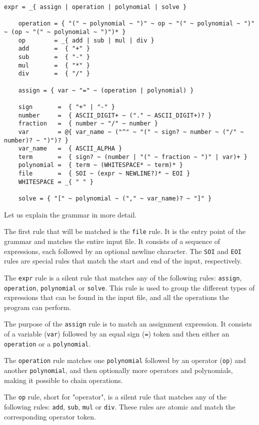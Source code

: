 \begin{lstlisting}[caption={The grammar for Symbotini}, label={lst:grammar}]
    expr = _{ assign | operation | polynomial | solve }
    
    operation = { "(" ~ polynomial ~ ")" ~ op ~ "(" ~ polynomial ~ ")" ~ (op ~ "(" ~ polynomial ~ ")")* }
    op        = _{ add | sub | mul | div }
    add       =  { "+" }
    sub       =  { "-" }
    mul       =  { "*" }
    div       =  { "/" }

    assign = { var ~ "=" ~ (operation | polynomial) }
    
    sign       =  { "+" | "-" }
    number     =  { ASCII_DIGIT+ ~ ("." ~ ASCII_DIGIT+)? }
    fraction   =  { number ~ "/" ~ number }
    var        = @{ var_name ~ ("^" ~ "(" ~ sign? ~ number ~ ("/" ~ number)? ~ ")")? }
    var_name   =  { ASCII_ALPHA }
    term       =  { sign? ~ (number | "(" ~ fraction ~ ")" | var)+ }
    polynomial =  { term ~ (WHITESPACE* ~ term)* }
    file       =  { SOI ~ (expr ~ NEWLINE?)* ~ EOI }
    WHITESPACE = _{ " " }

    solve = { "[" ~ polynomial ~ ("," ~ var_name)? ~ "]" }
\end{lstlisting}

Let us explain the grammar in more detail.

The first rule that will be matched is the \verb|file| rule. It is the entry point of the grammar and matches the entire input file. It consists of a sequence of expressions, each followed by an optional newline character. The \verb|SOI| and \verb|EOI| rules are special rules that match the start and end of the input, respectively.

The \verb|expr| rule is a silent rule that matches any of the following rules: \verb|assign|, \verb|operation|, \verb|polynomial| or \verb|solve|. This rule is used to group the different types of expressions that can be found in the input file, and all the operations the program can perform.

The purpose of the \verb|assign| rule is to match an assignment expression. It consists of a variable (\verb|var|) followed by an equal sign (\verb|=|) token and then either an \verb|operation| or a \verb|polynomial|.

The \verb|operation| rule matches one \verb|polynomial| followed by an operator (\verb|op|) and another \verb|polynomial|, and then optionally more operators and polynomials, making it possible to chain operations.

The \verb|op| rule, short for "operator", is a silent rule that matches any of the following rules: \verb|add|, \verb|sub|, \verb|mul| or \verb|div|. These rules are atomic and match the corresponding operator token.

